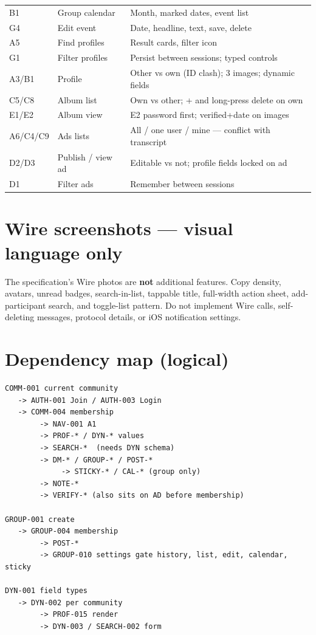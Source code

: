 \documentclass[11pt,a4paper]{article}
\begin{document}
\begin{longtable}{@{}p{1.6cm}p{4.4cm}p{8.2cm}@{}}
B1 & Group calendar & Month, marked dates, event list \\
G4 & Edit event & Date, headline, text, save, delete \\
A5 & Find profiles & Result cards, filter icon \\
G1 & Filter profiles & Persist between sessions; typed controls \\
A3/B1 & Profile & Other vs own (ID clash); 3 images; dynamic fields \\
C5/C8 & Album list & Own vs other; + and long-press delete on own \\
E1/E2 & Album view & E2 password first; verified+date on images \\
A6/C4/C9 & Ads lists & All / one user / mine --- conflict with transcript \\
D2/D3 & Publish / view ad & Editable vs not; profile fields locked on ad \\
D1 & Filter ads & Remember between sessions \\
\bottomrule
\end{longtable}

\section{Wire screenshots --- visual language only}
The specification's Wire photos are \textbf{not} additional features. Copy density, avatars, unread badges, search-in-list, tappable title, full-width action sheet, add-participant search, and toggle-list pattern. Do not implement Wire calls, self-deleting messages, protocol details, or iOS notification settings.

\section{Dependency map (logical)}
\begin{verbatim}
COMM-001 current community
   -> AUTH-001 Join / AUTH-003 Login
   -> COMM-004 membership
        -> NAV-001 A1
        -> PROF-* / DYN-* values
        -> SEARCH-*  (needs DYN schema)
        -> DM-* / GROUP-* / POST-*
             -> STICKY-* / CAL-* (group only)
        -> NOTE-*
        -> VERIFY-* (also sits on AD before membership)

GROUP-001 create
   -> GROUP-004 membership
        -> POST-*
        -> GROUP-010 settings gate history, list, edit, calendar, sticky

DYN-001 field types
   -> DYN-002 per community
        -> PROF-015 render
        -> DYN-003 / SEARCH-002 form
\end{verbatim}
\end{document}
